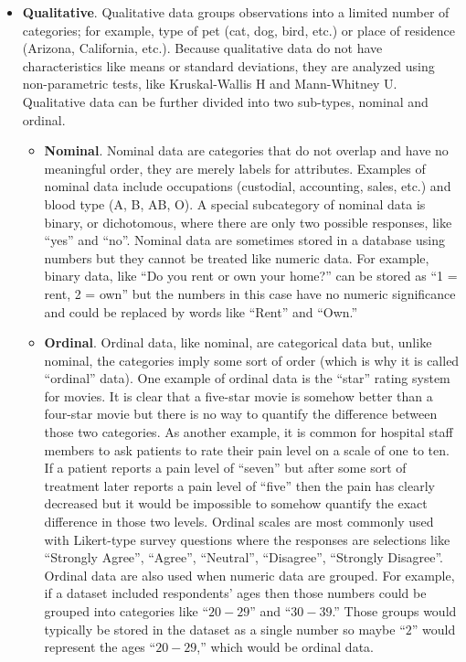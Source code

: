 \begin{itemize}
	
	\item \textbf{Qualitative}. Qualitative data groups observations into a limited number of categories; for example, type of pet (cat, dog, bird, etc.) or place of residence (Arizona, California, etc.). Because qualitative data do not have characteristics like means or standard deviations, they are analyzed using non-parametric tests, like Kruskal-Wallis H and Mann-Whitney U. Qualitative data can be further divided into two sub-types, nominal and ordinal.
	
	\begin{itemize}
		\item \textbf{Nominal}. Nominal data are categories that do not overlap and have no meaningful order, they are merely labels for attributes. Examples of nominal data include occupations (custodial, accounting, sales, etc.) and blood type (A, B, AB, O). A special subcategory of nominal data is binary, or dichotomous, where there are only two possible responses, like ``yes'' and ``no''. Nominal data are sometimes stored in a database using numbers but they cannot be treated like numeric data. For example, binary data, like ``Do you rent or own your home?'' can be stored as ``1 = rent, 2 = own'' but the numbers in this case have no numeric significance and could be replaced by words like ``Rent'' and ``Own.''
		
		\item \textbf{Ordinal}. Ordinal data, like nominal, are categorical data but, unlike nominal, the categories imply some sort of order (which is why it is called ``ordinal'' data). One example of ordinal data is the ``star'' rating system for movies. It is clear that a five-star movie is somehow better than a four-star movie but there is no way to quantify the difference between those two categories. As another example, it is common for hospital staff members to ask patients to rate their pain level on a scale of one to ten. If a patient reports a pain level of ``seven'' but after some sort of treatment later reports a pain level of ``five'' then the pain has clearly decreased but it would be impossible to somehow quantify the exact difference in those two levels. Ordinal scales are most commonly used with Likert-type survey questions where the responses are selections like ``Strongly Agree'', ``Agree'', ``Neutral'', ``Disagree'', ``Strongly Disagree''. Ordinal data are also used when numeric data are grouped. For example, if a dataset included respondents' ages then those numbers could be grouped into categories like ``$ 20-29 $'' and ``$ 30-39 $.'' Those groups would typically be stored in the dataset as a single number so maybe ``$ 2 $'' would represent the ages ``$ 20-29 $,'' which would be ordinal data.
	\end{itemize}
	

\end{itemize}
